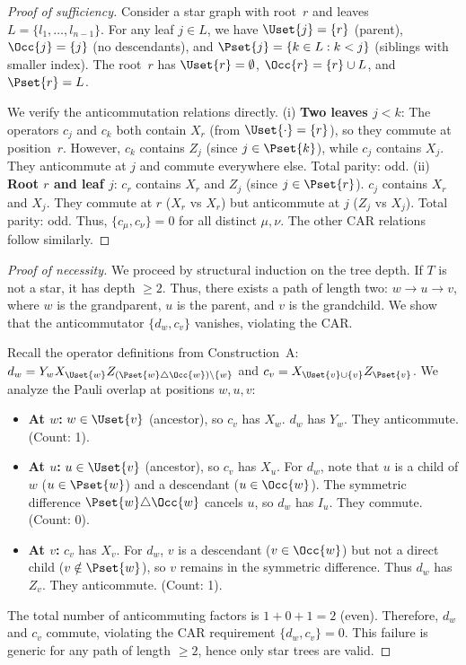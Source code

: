 \begin{proof}[Proof of sufficiency]
Consider a star graph with root~$r$ and leaves $L = \{l_1, \ldots, l_{n-1}\}$.
For any leaf $j \in L$, we have $\Uset{j} = \{r\}$ (parent),
$\Occ{j} = \{j\}$ (no descendants), and $\Pset{j} = \{k \in L : k < j\}$
(siblings with smaller index). The root~$r$ has $\Uset{r} = \emptyset$,
$\Occ{r} = \{r\} \cup L$, and $\Pset{r} = L$.

We verify the anticommutation relations directly.
(i) \textbf{Two leaves $j < k$}: The operators $c_j$ and $c_k$ both contain
$X_r$ (from $\Uset{\cdot} = \{r\}$), so they commute at position~$r$.
However, $c_k$ contains $Z_j$ (since $j \in \Pset{k}$), while $c_j$ contains
$X_j$. They anticommute at $j$ and commute everywhere else. Total parity: odd.
(ii) \textbf{Root $r$ and leaf $j$}: $c_r$ contains $X_r$ and $Z_j$ (since
$j \in \Pset{r}$). $c_j$ contains $X_r$ and $X_j$. They commute at $r$
($X_r$ vs $X_r$) but anticommute at $j$ ($Z_j$ vs $X_j$). Total parity: odd.
Thus, $\{c_\mu, c_\nu\} = 0$ for all distinct $\mu, \nu$. The other CAR relations follow similarly.
\end{proof}

\begin{proof}[Proof of necessity]
We proceed by structural induction on the tree depth. If $T$ is not a star,
it has depth $\ge 2$. Thus, there exists a path of length two:
$w \to u \to v$, where $w$ is the grandparent, $u$ is the parent, and $v$
is the grandchild. We show that the anticommutator $\{d_w, c_v\}$ vanishes, violating the CAR.

Recall the operator definitions from Construction~A:
$d_w = Y_w X_{\Uset{w}} Z_{(\Pset{w} \triangle \Occ{w}) \setminus \{w\}}$ and
$c_v = X_{\Uset{v} \cup \{v\}} Z_{\Pset{v}}$.
We analyze the Pauli overlap at positions $w, u, v$:
\begin{itemize}
  \item \textbf{At $w$:} $w \in \Uset{v}$ (ancestor), so $c_v$ has $X_w$.
    $d_w$ has $Y_w$. They anticommute. (Count: 1).
  \item \textbf{At $u$:} $u \in \Uset{v}$ (ancestor), so $c_v$ has $X_u$.
    For $d_w$, note that $u$ is a child of $w$ ($u \in \Pset{w}$) and a descendant
    ($u \in \Occ{w}$). The symmetric difference $\Pset{w} \triangle \Occ{w}$
    cancels $u$, so $d_w$ has $I_u$. They commute. (Count: 0).
  \item \textbf{At $v$:} $c_v$ has $X_v$. For $d_w$, $v$ is a descendant ($v \in \Occ{w}$)
    but not a direct child ($v \notin \Pset{w}$), so $v$ remains in the symmetric difference.
    Thus $d_w$ has $Z_v$. They anticommute. (Count: 1).
\end{itemize}
The total number of anticommuting factors is $1 + 0 + 1 = 2$ (even).
Therefore, $d_w$ and $c_v$ commute, violating the CAR requirement $\{d_w, c_v\} = 0$.
This failure is generic for any path of length $\ge 2$, hence only star trees are valid.
\end{proof}

